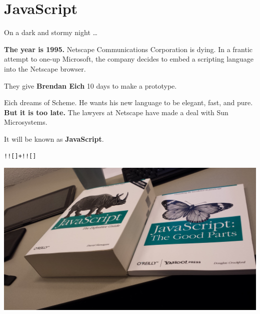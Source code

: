 \documentclass{lug}
\begin{document}
\renewcommand{\secimage}{graphics/sad_js}
\section{JavaScript}

\begin{frame}{On a dark and stormy night \dots}
    \begin{center}

        \textbf{The year is 1995.} Netscape Communications Corporation is
        dying. In a frantic attempt to one-up Microsoft, the company decides to
        embed a scripting language into the Netscape browser.
        
        \vspace{2ex}
        
        They give \textbf{Brendan Eich} 10 days to make a prototype.

        \vspace{2ex}

        Eich dreams of Scheme. He wants his new language to be elegant, fast,
        and pure. \textbf{But it is too late.} The lawyers at Netscape have made a deal
        with Sun Microsystems.

        \vspace{2ex}
        
        It will be known as \textbf{JavaScript}.
    \end{center}
\end{frame}

\begin{frame}{\texttt{!![]+!![]}}
    \begin{center}
        \includegraphics[width=\textwidth]{graphics/js_the_good}
    \end{center}
\end{frame}
\end{document}
